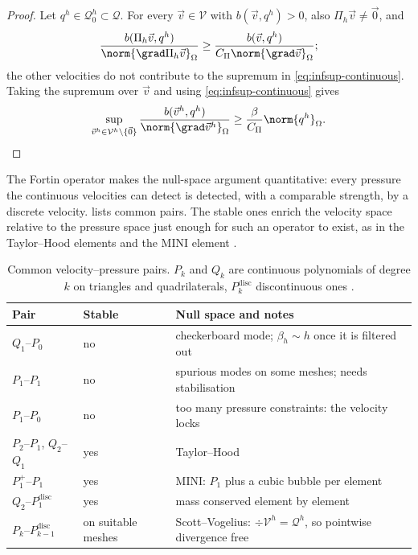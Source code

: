 \begin{proof}
Let $q^h \in \mathcal{Q}^h_0 \subset \mathcal{Q}$. For every $\vec{v} \in \mathcal{V}$ with $b(\vec{v}, q^h) > 0$, also $\Pi_h\vec{v} \neq \vec{0}$, and
\begin{equation*}
    \frac{b(\Pi_h\vec{v}, q^h)}{\norm{\grad \Pi_h\vec{v}}_\Omega}
    \geq \frac{b(\vec{v}, q^h)}{C_\Pi \norm{\grad\vec{v}}_\Omega} ;
\end{equation*}
the other velocities do not contribute to the supremum in \cref{eq:infsup-continuous}. Taking the supremum over $\vec{v}$ and using \cref{eq:infsup-continuous} gives
\begin{equation*}
    \sup_{\vec{v}^h \in \mathcal{V}^h \setminus \{\vec{0}\}} \frac{b(\vec{v}^h, q^h)}{\norm{\grad\vec{v}^h}_\Omega}
    \geq \frac{\beta}{C_\Pi} \norm{q^h}_\Omega . \qedhere
\end{equation*}
\end{proof}

The Fortin operator makes the null-space argument quantitative: every pressure the continuous velocities can detect is detected, with a comparable strength, by a discrete velocity.  lists common pairs. The stable ones enrich the velocity space relative to the pressure space just enough for such an operator to exist, as in the Taylor--Hood elements \parencite{Taylor1973} and the MINI element \parencite{Arnold1984}.

\begin{table}[tbp]
    \centering
    \caption[Common velocity--pressure pairs]{Common velocity--pressure pairs. $P_k$ and $Q_k$ are continuous polynomials of degree $k$ on triangles and quadrilaterals, $P_k^\mathrm{disc}$ discontinuous ones \parencite{Boffi2013}.}
    \label{tab:infsup-pairs}
    \begin{tabularx}{\textwidth}{@{}l l X@{}}
        \toprule
        Pair & Stable & Null space and notes \\
        \midrule
        $Q_1$--$P_0$                      & no  & checkerboard mode; $\beta_h \sim h$ once it is filtered out \\
        $P_1$--$P_1$                      & no  & spurious modes on some meshes; needs stabilisation \\
        $P_1$--$P_0$                      & no  & too many pressure constraints: the velocity locks \\
        $P_2$--$P_1$, $Q_2$--$Q_1$        & yes & Taylor--Hood \\
        $P_1^{+}$--$P_1$                  & yes & MINI: $P_1$ plus a cubic bubble per element \\
        $Q_2$--$P_1^\mathrm{disc}$        & yes & mass conserved element by element \\
        $P_k$--$P_{k-1}^\mathrm{disc}$    & on suitable meshes & Scott--Vogelius: $\div \mathcal{V}^h = \mathcal{Q}^h$, so pointwise divergence free \\
        \bottomrule
    \end{tabularx}
\end{table}

